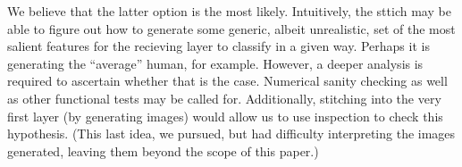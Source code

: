\documentclass{article} %
\begin{document}
We believe that the latter option is the most likely. Intuitively, the sttich may be able to figure out how to
generate some generic, albeit unrealistic, set of the most salient features for the recieving layer to classify
in a given way. Perhaps it is generating the ``average'' human, for example. However, a deeper analysis is required
to ascertain whether that is the case. Numerical sanity checking as well as other functional tests may be called
for. Additionally, stitching into the very first layer (by generating images) would allow us to use inspection to
check this hypothesis. (This last idea, we pursued, but had difficulty interpreting the images generated, leaving them
beyond the scope of this paper.)

\newpage


\end{document}
